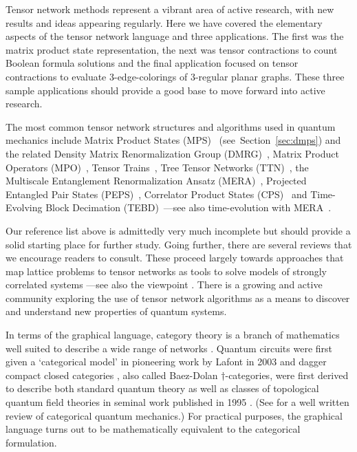 \documentclass[aps,pra,12pt,nofootinbib,superscriptaddress,longbibliography]{revtex4-1}
\theoremstyle{plain}
\theoremstyle{definition}
\begin{document}
 
Tensor network methods represent a vibrant area of active research, with new results and ideas appearing regularly. Here we have covered the elementary aspects of the tensor network language and three applications.  The first was the matrix product state representation, the next was tensor contractions to count Boolean formula solutions and the final application focused on tensor contractions to evaluate 3-edge-colorings 
of 3-regular planar graphs.
These three sample applications should provide a good base to move forward into active research.  
 
The most common tensor network structures and algorithms used in quantum mechanics include
Matrix Product States (MPS)~\cite{1992CMaPh.144..443F,1995PhRvL..75.3537O, 1997PhRvB..55.2164R} (see~Section~\ref{sec:dmps}) and the related
Density Matrix Renormalization Group (DMRG)~\cite{2011AnPhy.326...96S},
Matrix Product Operators (MPO)~\cite{2004PhRvL..93t7204V}, Tensor Trains~\cite{MAL-059}, 
Tree Tensor Networks (TTN)~\cite{2006PhRvA..74b2320S},
the Multiscale Entanglement Renormalization Ansatz (MERA)~\cite{Vidal2010,2007PhRvL..99v0405V,2008PhRvL.101r0503G,2008PhRvL.101k0501V},
Projected Entangled Pair States (PEPS)~\cite{2006PhRvL..96v0601V},
Correlator Product States (CPS)~\cite{2011PhRvB..84t5108A}
and Time-Evolving Block Decimation (TEBD)~\cite{2003PhRvL..91n7902V}---see
also time-evolution with MERA~\cite{2008PhRvA..77e2328R,2014GReGr..46.1823M}.   

Our reference list above is admittedly very much incomplete but should provide a solid starting place for further study.  Going further, there are several reviews that we encourage readers to consult.  These proceed largely towards approaches that map lattice problems to tensor networks as tools to solve models of strongly correlated systems \cite{2016arXiv160303039B, 2014AnPhy.349..117O, Vidal2010, MPSreview08, TNSreview09, 2011AnPhy.326...96S, Schollw, 2014EPJB...87..280O}---see also the viewpoint \cite{2010arXiv1006.0675S}.
There is a growing and active community exploring the use of tensor network algorithms as a means to discover and understand new properties of quantum systems.  

In terms of the graphical language, category theory is a branch of mathematics well suited to describe a wide range of networks \cite{2009arXiv0908.2469B}.  Quantum circuits were first given a `categorical model' in pioneering work by Lafont in 2003 \cite{Lafont03towardsan} and dagger compact closed categories \cite{BD95}, also called Baez-Dolan $\dagger$-categories, were first derived to describe both standard quantum theory as well as classes of topological quantum field theories in seminal work published in 1995 \cite{BD95}. (See \cite{2009arXiv0908.2469B} for a well written review of categorical quantum mechanics.)  For practical purposes, the graphical language turns out to be mathematically equivalent to the categorical formulation.
\end{document}
